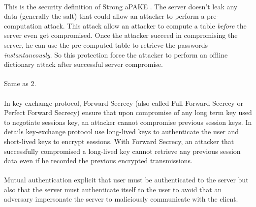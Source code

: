 \documentclass[../report.tex]{subfiles}
\begin{document}
\paragraph{}
This is the security definition of Strong aPAKE \cite{OPAQUE_Paper}. The server doesn't leak any data (generally the salt) that could allow an attacker to perform a pre-computation attack. This attack allow an attacker to compute a table \emph{before} the server even get compromised. Once the attacker succeed in compromising the server, he can use the pre-computed table to retrieve the passwords \emph{instantaneously}. So this protection force the attacker to perform an offline dictionary attack after successful server compromise. %

\paragraph{}
Same as 2.

\paragraph{}
In key-exchange protocol, Forward Secrecy (also called Full Forward Secrecy or Perfect Forward Secrecy) ensure that upon compromise of any long term key used to negotiate sessions key, an attacker cannot compromise previous session keys.
In details key-exchange protocol use long-lived keys to authenticate the user and short-lived keys to encrypt sessions. With Forward Secrecy, an attacker that successfully compromised a long-lived key cannot retrieve any previous session data even if he recorded the previous encrypted transmissions. %

\paragraph{}
Mutual authentication explicit that user must be authenticated to the server but also that the server must authenticate itself to the user to avoid that an adversary impersonate the server to maliciously communicate with the client.
\end{document}
